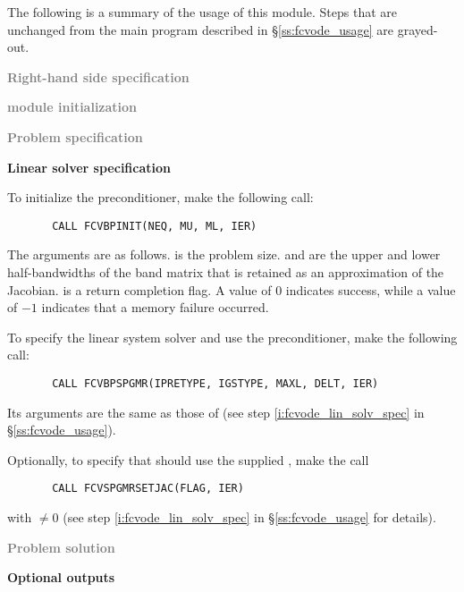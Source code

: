 The following is a summary of the usage of this module. Steps that are unchanged
from the main program described in \S\ref{ss:fcvode_usage} are grayed-out.

\begin{Steps}
  
\item \textcolor{gray}{\bf Right-hand side specification}

\item \textcolor{gray}{\bf {\nvector} module initialization}

\item \textcolor{gray}{\bf Problem specification}

\item {\bf Linear solver specification}

  To initialize the {\cvbandpre} preconditioner, make the following call:
\begin{verbatim}
       CALL FCVBPINIT(NEQ, MU, ML, IER)
\end{verbatim}
  The arguments are as follows.
   is the problem size.
   and  are the upper and lower half-bandwidths of the band matrix
  that  is retained as an approximation of the Jacobian.
   is a return completion flag.  A value of $0$ indicates success, while 
  a value of $-1$ indicates that a memory failure occurred.
  
  To specify the {\spgmr} linear system solver and use the {\cvbandpre}
  preconditioner, make the following call:
\begin{verbatim}
       CALL FCVBPSPGMR(IPRETYPE, IGSTYPE, MAXL, DELT, IER)
\end{verbatim}
  Its arguments are the same as those of 
  (see step \ref{i:fcvode_lin_solv_spec} in \S\ref{ss:fcvode_usage}).
  

  Optionally, to specify that {\spgmr} should use the supplied , 
  make the call
\begin{verbatim}
       CALL FCVSPGMRSETJAC(FLAG, IER)
\end{verbatim}
  with  $\neq 0$ 
  (see step \ref{i:fcvode_lin_solv_spec} in \S\ref{ss:fcvode_usage} for details).
  
\item \textcolor{gray}{\bf Problem solution}
  
\item {\bf {\cvbbdpre} Optional outputs}
  

\end{Steps}
